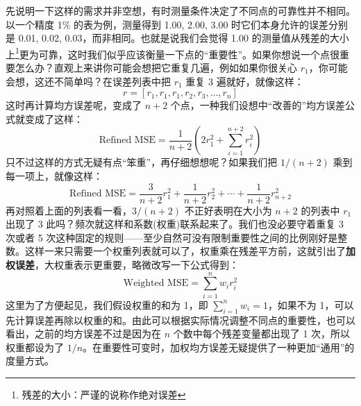 \documentclass[UTF8, 12pt]{article}
\begin{document}
\begin{itemize}
          先说明一下这样的需求并非空想，有时测量条件决定了不同点的可靠性并不相同。以一个精度 1\% 的表为例，测量得到 1.00, 2.00, 3.00 时它们本身允许的误差分别是 0.01, 0.02, 0.03，而非相同。也就是说我们会觉得 1.00 的测量值从残差的大小上\footnote{残差的大小：严谨的说称作绝对误差}更为可靠，这时我们似乎应该衡量一下点的“重要性”。如果你想说一个点很重要怎么办？直观上来讲你可能会想把它重复几遍，例如如果你很关心 $r_1$，你可能会想，这还不简单吗？在误差列表中把 $r_1$ 重复 3 遍就好，就像这样：
          \[
              r = [r_1, r_1, r_1, r_2, r_3, \ldots, r_n]
          \]
          这时再计算均方误差呢，变成了 $n+2$ 个点，一种我们设想中“改善的”均方误差公式就变成了这样：
          \[
              \text{Refined MSE} = \frac1{n+2} \left(2r_1^2 + \sum_{i=1}^{n+2} r_i^2\right)
          \]
          只不过这样的方式无疑有点“笨重”，再仔细想想呢？如果我们把 $1/(n+2)$ 乘到每一项上，就像这样：
          \[
              \text{Refined MSE} = \frac3{n+2} r_1^2 + \frac1{n+2} r_2^2 + \cdots + \frac1{n+2} r_{n+2}^2
          \]
          再对照着上面的列表看一看，$3/(n+2)$ 不正好表明在大小为 $n+2$ 的列表中 $r_1$ 出现了 3 此吗？频次就这样和系数(权重)联系起来了。我们也没必要守着重复 3 次或者 5 次这种固定的规则——至少自然可没有限制重要性之间的比例刚好是整数。这样一来只需要一个权重列表就可以了，权重乘在残差平方前，这就引出了\textbf{加权误差}，大权重表示更重要，略微改写一下公式得到：
          \[
              \text{Weighted MSE} = \sum_{i=1}^n w_i r_i^2
          \]
          这里为了方便起见，我们假设权重的和为 1，即 $\sum_{i=1}^n w_i = 1$，如果不为 1，可以先计算误差再除以权重的和。由此可以根据实际情况调整不同点的重要性，也可以看出，之前的均方误差不过是因为在 $n$ 个数中每个残差变量都出现了 1 次，所以权重都设为了 $1/n$。在重要性可变时，加权均方误差无疑提供了一种更加“通用”的度量方式。
\end{itemize}
\end{document}
